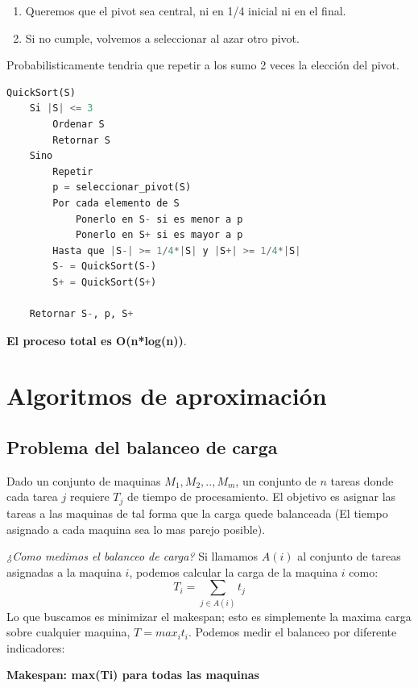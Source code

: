 \documentclass{article}
\begin{document}
\begin{enumerate}
    \item Queremos que el pivot sea central, ni en 1/4 inicial ni en el final.
    \item Si no cumple, volvemos a seleccionar al azar otro pivot.
\end{enumerate}
Probabilisticamente tendria que repetir a los sumo 2 veces la elección del pivot.

\begin{lstlisting}[language=Python, caption=Algoritmo QuickSort ramdomizado]
QuickSort(S)
    Si |S| <= 3
        Ordenar S
        Retornar S
    Sino
        Repetir 
        p = seleccionar_pivot(S)
        Por cada elemento de S
            Ponerlo en S- si es menor a p
            Ponerlo en S+ si es mayor a p
        Hasta que |S-| >= 1/4*|S| y |S+| >= 1/4*|S|  
        S- = QuickSort(S-)
        S+ = QuickSort(S+)
    
    Retornar S-, p, S+
\end{lstlisting} 
    
\textbf{El proceso total es O(n*log(n))}.






\newpage
\section{Algoritmos de aproximación}

\subsection{Problema del balanceo de carga}

Dado un conjunto de maquinas \(M_1,M_2,..,M_m\), un conjunto de \(n\) tareas donde cada tarea \(j\)
requiere \(T_j\) de tiempo de procesamiento. El objetivo es asignar las tareas a las maquinas
de tal forma que la carga quede balanceada (El tiempo asignado a cada maquina sea lo mas parejo posible).

\textit{¿Como medimos el balanceo de carga?} Si llamamos \(A(i)\) al conjunto de tareas asignadas a la 
maquina \(i\), podemos calcular la carga de la maquina \(i\) como:
\[
    T_i=\sum_{ j\in A(i)}t_j
\]
Lo que buscamos es minimizar el makespan; esto es simplemente la maxima carga 
sobre cualquier maquina, \(T = max_i t_i\). Podemos medir el balanceo por diferente indicadores:

\textbf{Makespan: max(Ti) para todas las maquinas}
\end{document}
